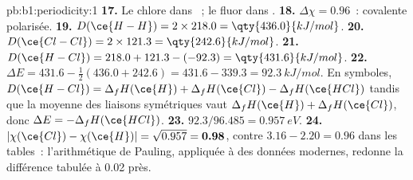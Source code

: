 \begin{solution}{pb:b1:periodicity:1}
\textbf{17.} Le chlore dans ~; le fluor dans .
\textbf{18.} $\Delta\chi = 0.96$~: covalente polarisée.
\textbf{19.} $D(\ce{H-H}) = 2 \times 218.0 = \qty{436.0}{kJ/mol}$.
\textbf{20.} $D(\ce{Cl-Cl}) = 2 \times 121.3 = \qty{242.6}{kJ/mol}$.
\textbf{21.} $D(\ce{H-Cl}) = 218.0 + 121.3 - (-92.3) = \qty{431.6}{kJ/mol}$.
\textbf{22.} $\Delta E = 431.6 - \tfrac12(436.0 + 242.6) = 431.6 - 339.3 =
\qty{92.3}{kJ/mol}$. En symboles, $D(\ce{H-Cl}) = \Delta_fH(\ce{H}) +
\Delta_fH(\ce{Cl}) - \Delta_fH(\ce{HCl})$ tandis que la moyenne des
liaisons symétriques vaut $\Delta_fH(\ce{H}) + \Delta_fH(\ce{Cl})$, donc
$\Delta E =
-\Delta_fH(\ce{HCl})$.
\textbf{23.} $92.3/96.485 = \qty{0.957}{eV}$.
\textbf{24.} $|\chi(\ce{Cl}) - \chi(\ce{H})| = \sqrt{0.957} =
\textbf{0.98}$, contre $3.16 - 2.20 = 0.96$ dans les tables~:
l'arithmétique de Pauling, appliquée à des données modernes, redonne
la différence tabulée à 0.02 près.
\end{solution}
